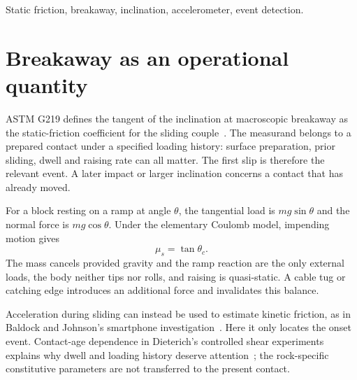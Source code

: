 \begin{abstract}
A breakaway angle identifies a static-friction estimate only when the inclination belongs to the contact state preceding motion. We combine gravity-sensitive acceleration with a separately timed linear-acceleration trigger and retain the first sustained excursion after arming. In the data, the first above-threshold sample occurs at 20.002~s, confirmation follows at 20.142~s, and the selected pre-slip inclination is $25.104^\circ$, giving $\mu_s=0.4685$. Timing, mounting and contact history enter the interpretation differently: the small local angular scatter does not determine the uncertainty of a material coefficient from one slip event.
\end{abstract}
\begin{IEEEkeywords}
Static friction, breakaway, inclination, accelerometer, event detection.
\end{IEEEkeywords}

\section{Breakaway as an operational quantity}
ASTM G219 defines the tangent of the inclination at macroscopic breakaway as the static-friction coefficient for the sliding couple~\cite{astmg2192024}. The measurand belongs to a prepared contact under a specified loading history: surface preparation, prior sliding, dwell and raising rate can all matter. The first slip is therefore the relevant event. A later impact or larger inclination concerns a contact that has already moved.

For a block resting on a ramp at angle $\theta$, the tangential load is $mg\sin\theta$ and the normal force is $mg\cos\theta$. Under the elementary Coulomb model, impending motion gives
\begin{equation}
 \mu_s=\tan\theta_c.
 \label{eq:static-friction-model}
\end{equation}
The mass cancels provided gravity and the ramp reaction are the only external loads, the body neither tips nor rolls, and raising is quasi-static. A cable tug or catching edge introduces an additional force and invalidates this balance.

Acceleration during sliding can instead be used to estimate kinetic friction, as in Baldock and Johnson's smartphone investigation~\cite{baldock2016}. Here it only locates the onset event. Contact-age dependence in Dieterich's controlled shear experiments explains why dwell and loading history deserve attention~\cite{dieterich1979}; the rock-specific constitutive parameters are not transferred to the present contact.

